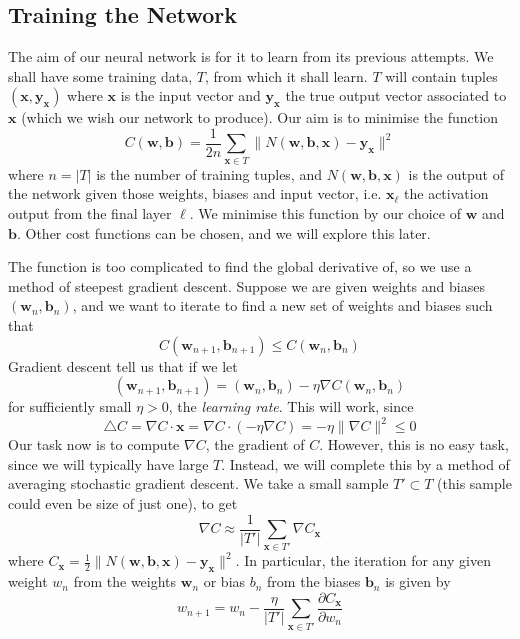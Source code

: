 \documentclass[10pt]{article}
\begin{document}
\subsection{Training the Network}
The aim of our neural network is for it to learn from its previous attempts. We shall have some training data, $T$, from which it shall learn. $T$ will contain tuples $(\mathbf{x},\mathbf{y_x})$ where $\mathbf{x}$ is the input vector and $\mathbf{y_x}$ the true output vector associated to $\mathbf{x}$ (which we wish our network to produce). Our aim is to minimise the function
\[
C(\mathbf{w},\mathbf{b})= \frac{1}{2n} \sum_{\mathbf{x} \in T}\lVert N(\mathbf{w},\mathbf{b},\mathbf{x}) - \mathbf{y_x}\rVert ^2
\]
where $n=|T|$ is the number of training tuples, and $N(\mathbf{w},\mathbf{b},\mathbf{x})$ is the output of the network given those weights, biases and input vector, i.e. $\mathbf{x}_{\ell}$ the activation output from the final layer $\ell$. We minimise this function by our choice of $\mathbf{w}$ and $\mathbf{b}$. Other cost functions can be chosen, and we will explore this later.\par
The function is too complicated to find the global derivative of, so we use a method of steepest gradient descent. Suppose we are given weights and biases $(\mathbf{w}_n, \mathbf{b}_n)$, and we want to iterate to find a new set of weights and biases such that
\[
C(\mathbf{w}_{n+1}, \mathbf{b}_{n+1}) \leq C(\mathbf{w}_n, \mathbf{b}_n)
\]
Gradient descent tell us that if we let
\[
(\mathbf{w}_{n+1}, \mathbf{b}_{n+1}) = (\mathbf{w}_n, \mathbf{b}_n) - \eta \nabla C (\mathbf{w}_{n}, \mathbf{b}_{n})
\]
for sufficiently small $\eta>0$, the \textit{learning rate}. This will work, since
\[
\triangle C = \nabla C \cdot \mathbf{x} = \nabla C \cdot \left( - \eta \nabla C  \right) = - \eta \lVert \nabla C \rVert ^2  \leq 0 
\]
Our task now is to compute $\nabla C$, the gradient of $C$. However, this is no easy task, since we will typically have large $T$. Instead, we will complete this by a method of averaging stochastic gradient descent. We take a small sample $T' \subset T$ (this sample could even be size of just one), to get
\[
\nabla C \approx \frac{1}{|T'|} \sum_{\mathbf{x} \in T'} \nabla C_\mathbf{x}
\]
where $C_\mathbf{x} = \frac{1}{2}\lVert N(\mathbf{w},\mathbf{b},\mathbf{x}) - \mathbf{y_x}\rVert ^2$. In particular, the iteration for any given weight $w_n$ from the weights $\mathbf{w}_n$ or bias $b_n$ from the biases $\mathbf{b}_n$ is given by
\[
w_{n+1} = w_n - \frac{\eta}{|T'|} \sum_{\mathbf{x} \in T'} \frac{\partial C_{\mathbf{x}}}{\partial w_n}
\]
\end{document}
